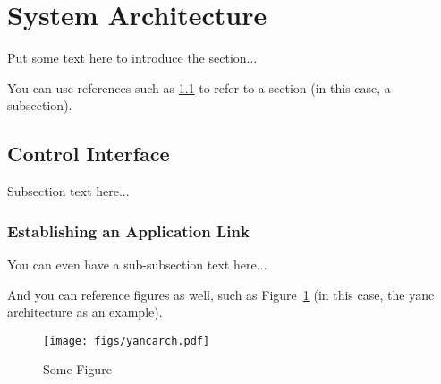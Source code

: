 \section{System Architecture}
\label{sec:arch}

Put some text here to introduce the section...

You can use references such as \ref{sec:arch:control} to refer to a section (in this case, a subsection).


\subsection{Control Interface}
\label{sec:arch:control}

Subsection text here...

\subsubsection{Establishing an Application Link}

You can even have a sub-subsection text here...

And you can reference figures as well, such as Figure~\ref{fig:yancarch} (in this case, the yanc architecture as an example).

\begin{figure}[h]
    \centering
    \texttt{[image: figs/yancarch.pdf]}
    \caption{Some Figure}
    \label{fig:yancarch}
\end{figure}

